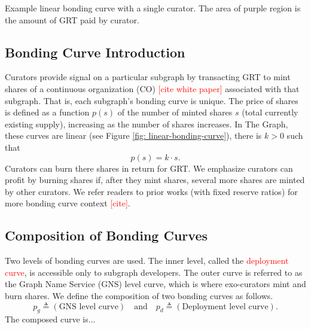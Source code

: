 {\begin{sidefigure}
    
    \vspace*{-0.1in}
    \caption[Linear Bonding Curve Diagram]{Example   linear bonding curve with a single curator. The   area of purple region is the  amount of GRT paid by   curator.}
    \label{fig: linear-bonding-curve}
\end{sidefigure}


\subsection{Bonding Curve Introduction}
Curators provide signal on a particular subgraph by transacting GRT to mint shares of a continuous organization (CO) \textcolor{red}{[cite white paper]} associated with that subgraph. That is, each subgraph’s bonding curve is unique. The price of shares is defined as a function $p(s)$ of the number of minted shares $s$ (\ie total currently existing supply), increasing as the number of shares increases.   In The Graph, these curves are linear (\eg see Figure \ref{fig: linear-bonding-curve}), \ie there is\sidenote[][]{\textcolor{red}{The implemented value as of writing is $k=0.03$.}} $k > 0$ such that
\begin{equation}
    p(s) = k \cdot s.
\end{equation}
Curators can burn there shares in return for GRT.
We emphasize curators can profit by burning shares if, after they mint shares, several more shares are minted by other curators.
We refer readers to prior works (\eg with fixed reserve ratios) for more bonding curve context \textcolor{red}{[cite]}.

\newpage

\subsection{Composition of Bonding Curves} Two levels of bonding curves are used. The inner level, called the \textcolor{red}{deployment curve}, is accessible only to subgraph developers. The   outer curve is referred to as the  Graph Name Service (GNS) level curve, which is where exo-curators mint and burn shares. 
We define the composition of two bonding curves as follows. 
\begin{equation}
    p_g \triangleq (\mbox{GNS level curve})
    \quad \mbox{and} \quad
    p_d \triangleq (\mbox{Deployment level curve}).
    \label{eq: def-bonding-curve-levels}
\end{equation} 
The composed curve is...





}
